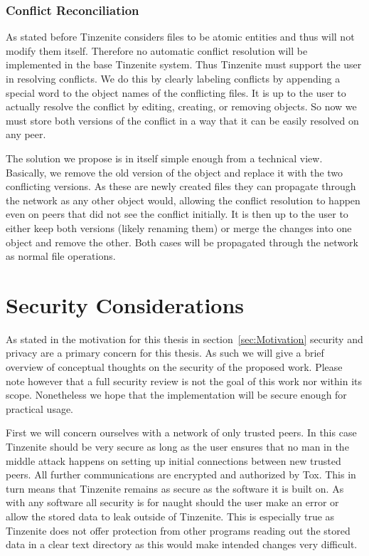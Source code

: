 \subsubsection{Conflict Reconciliation}
\label{subs:Conflict Reconciliation}

As stated before Tinzenite considers files to be atomic entities and thus will not modify them itself.
Therefore no automatic conflict resolution will be implemented in the base Tinzenite system.
Thus Tinzenite must support the user in resolving conflicts.
We do this by clearly labeling conflicts by appending a special word to the object names of the conflicting files.
It is up to the user to actually resolve the conflict by editing, creating, or removing objects.
So now we must store both versions of the conflict in a way that it can be easily resolved on any peer.

The solution we propose is in itself simple enough from a technical view.
Basically, we remove the old version of the object and replace it with the two conflicting versions.
As these are newly created files they can propagate through the network as any other object would, allowing the conflict resolution to happen even on peers that did not see the conflict initially.
It is then up to the user to either keep both versions (likely renaming them) or merge the changes into one object and remove the other.
Both cases will be propagated through the network as normal file operations.

\section{Security Considerations}
\label{sec:Security Considerations}

As stated in the motivation for this thesis in section~\ref{sec:Motivation} security and privacy are a primary concern for this thesis.
As such we will give a brief overview of conceptual thoughts on the security of the proposed work.
Please note however that a full security review is not the goal of this work nor within its scope.
Nonetheless we hope that the implementation will be secure enough for practical usage.

First we will concern ourselves with a network of only trusted peers.
In this case Tinzenite should be very secure as long as the user ensures that no man in the middle attack happens on setting up initial connections between new trusted peers.
All further communications are encrypted and authorized by Tox.
This in turn means that Tinzenite remains as secure as the software it is built on.
As with any software all security is for naught should the user make an error or allow the stored data to leak outside of Tinzenite.
This is especially true as Tinzenite does not offer protection from other programs reading out the stored data in a clear text directory as this would make intended changes very difficult.

